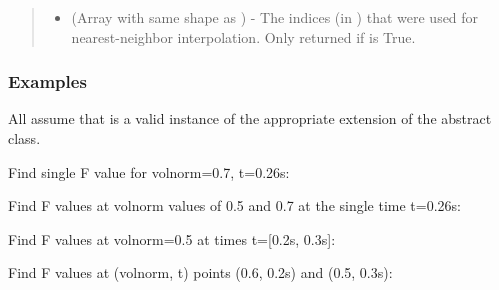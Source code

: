 \documentclass[letterpaper,10pt,english]{sphinxmanual}
\begin{document}
\begin{fulllineitems}
\begin{fulllineitems}
\begin{quote}
\begin{description}
\begin{itemize}
\item {} 
 (Array with same shape as ) - The indices
(in ) that were used for
nearest-neighbor interpolation. Only returned if  is
True.

\end{itemize}


\end{description}\end{quote}
\subsubsection*{Examples}

All assume that  is a valid instance of the appropriate
extension of the {\hyperref[\detokenize{eqtools:eqtools.core.Equilibrium}]{}} abstract class.

Find single F value for volnorm=0.7, t=0.26s:

\begin{sphinxVerbatim}[commandchars=\\\{\}]
   
\end{sphinxVerbatim}

Find F values at volnorm values of 0.5 and 0.7 at the single time
t=0.26s:

\begin{sphinxVerbatim}[commandchars=\\\{\}]
  \PYG{p}{[} \PYG{p}{]} 
\end{sphinxVerbatim}

Find F values at volnorm=0.5 at times t={[}0.2s, 0.3s{]}:

\begin{sphinxVerbatim}[commandchars=\\\{\}]
   \PYG{p}{[} \PYG{p}{]}
\end{sphinxVerbatim}

Find F values at (volnorm, t) points (0.6, 0.2s) and (0.5, 0.3s):


\end{fulllineitems}
\end{fulllineitems}
\end{document}
